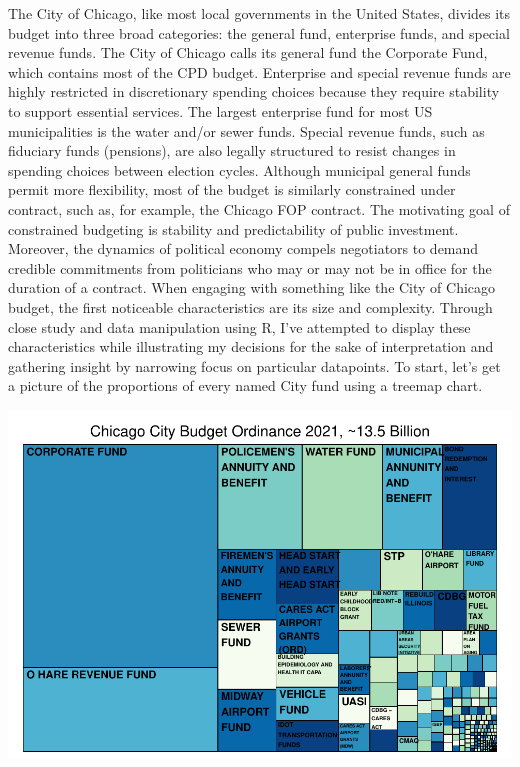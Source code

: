 \documentclass[
]{article}
\begin{document}
\setlength{\parindent}{5ex}

The City of Chicago, like most local governments in the United States,
divides its budget into three broad categories: the general fund,
enterprise funds, and special revenue funds. The City of Chicago calls
its general fund the Corporate Fund, which contains most of the CPD
budget. Enterprise and special revenue funds are highly restricted in
discretionary spending choices because they require stability to support
essential services. The largest enterprise fund for most US
municipalities is the water and/or sewer funds. Special revenue funds,
such as fiduciary funds (pensions), are also legally structured to
resist changes in spending choices between election cycles. Although
municipal general funds permit more flexibility, most of the budget is
similarly constrained under contract, such as, for example, the Chicago
FOP contract. The motivating goal of constrained budgeting is stability
and predictability of public investment. Moreover, the dynamics of
political economy compels negotiators to demand credible commitments
from politicians who may or may not be in office for the duration of a
contract. \setlength{\parindent}{5ex} When engaging with something like
the City of Chicago budget, the first noticeable characteristics are its
size and complexity. Through close study and data manipulation using R,
I've attempted to display these characteristics while illustrating my
decisions for the sake of interpretation and gathering insight by
narrowing focus on particular datapoints. To start, let's get a picture
of the proportions of every named City fund using a treemap chart.

\begin{center}\includegraphics{cpd_budget_analysis_files/figure-latex/full budget treemap-1} \end{center}
\end{document}
